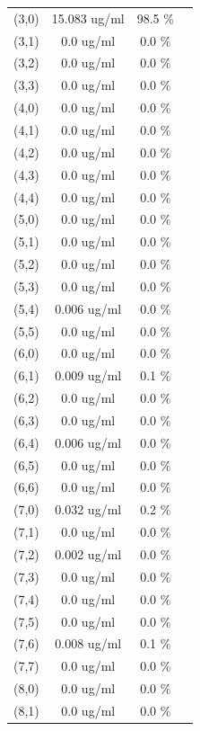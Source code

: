 \documentclass{article}
\begin{document}
\begin{tabular}{c c c c}
(3,0)&        15.083 ug/ml        &98.5 \%\\
(3,1)&        0.0 ug/ml        &0.0 \%\\
(3,2)&        0.0 ug/ml        &0.0 \%\\
(3,3)&        0.0 ug/ml        &0.0 \%\\
(4,0)&        0.0 ug/ml        &0.0 \%\\
(4,1)&        0.0 ug/ml        &0.0 \%\\
(4,2)&        0.0 ug/ml        &0.0 \%\\
(4,3)&        0.0 ug/ml        &0.0 \%\\
(4,4)&        0.0 ug/ml        &0.0 \%\\
(5,0)&        0.0 ug/ml        &0.0 \%\\
(5,1)&        0.0 ug/ml        &0.0 \%\\
(5,2)&        0.0 ug/ml        &0.0 \%\\
(5,3)&        0.0 ug/ml        &0.0 \%\\
(5,4)&        0.006 ug/ml        &0.0 \%\\
(5,5)&        0.0 ug/ml        &0.0 \%\\
(6,0)&        0.0 ug/ml        &0.0 \%\\
(6,1)&        0.009 ug/ml        &0.1 \%\\
(6,2)&        0.0 ug/ml        &0.0 \%\\
(6,3)&        0.0 ug/ml        &0.0 \%\\
(6,4)&        0.006 ug/ml        &0.0 \%\\
(6,5)&        0.0 ug/ml        &0.0 \%\\
(6,6)&        0.0 ug/ml        &0.0 \%\\
(7,0)&        0.032 ug/ml        &0.2 \%\\
(7,1)&        0.0 ug/ml        &0.0 \%\\
(7,2)&        0.002 ug/ml        &0.0 \%\\
(7,3)&        0.0 ug/ml        &0.0 \%\\
(7,4)&        0.0 ug/ml        &0.0 \%\\
(7,5)&        0.0 ug/ml        &0.0 \%\\
(7,6)&        0.008 ug/ml        &0.1 \%\\
(7,7)&        0.0 ug/ml        &0.0 \%\\
(8,0)&        0.0 ug/ml        &0.0 \%\\
(8,1)&        0.0 ug/ml        &0.0 \%\\

\end{tabular}
\end{document}
